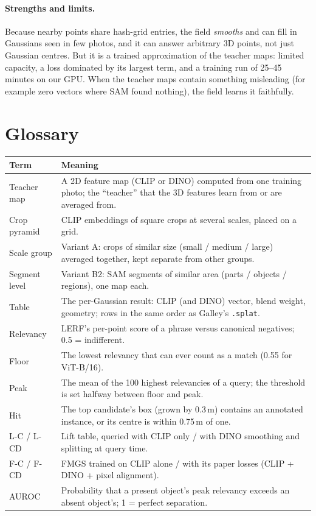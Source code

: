 \documentclass[11pt,a4paper]{article}
\newcommand{\code}[1]{\texttt{#1}}
\begin{document}
\paragraph{Strengths and limits.} Because nearby points share hash-grid entries, the field \emph{smooths} and can
fill in Gaussians seen in few photos, and it can answer arbitrary 3D points, not just Gaussian centres. But it is a
trained approximation of the teacher maps: limited capacity, a loss dominated by its largest term, and a training run
of 25--45 minutes on our GPU. When the teacher maps contain something misleading (for example zero vectors where SAM
found nothing), the field learns it faithfully.

\section{Glossary}

\begin{table}[ht]
\centering\small
\begin{tabularx}{\linewidth}{@{}lL@{}}
\toprule
Term & Meaning \\
\midrule
Teacher map & A 2D feature map (CLIP or DINO) computed from one training photo; the ``teacher'' that the 3D features learn from or are averaged from. \\
Crop pyramid & CLIP embeddings of square crops at several scales, placed on a grid. \\
Scale group & Variant A: crops of similar size (small / medium / large) averaged together, kept separate from other groups. \\
Segment level & Variant B2: SAM segments of similar area (parts / objects / regions), one map each. \\
Table & The per-Gaussian result: CLIP (and DINO) vector, blend weight, geometry; rows in the same order as Galley's \code{.splat}. \\
Relevancy & LERF's per-point score of a phrase versus canonical negatives; 0.5 = indifferent. \\
Floor & The lowest relevancy that can ever count as a match (0.55 for ViT-B/16). \\
Peak & The mean of the 100 highest relevancies of a query; the threshold is set halfway between floor and peak. \\
Hit & The top candidate's box (grown by 0.3\,m) contains an annotated instance, or its centre is within 0.75\,m of one. \\
L-C / L-CD & Lift table, queried with CLIP only / with DINO smoothing and splitting at query time. \\
F-C / F-CD & FMGS trained on CLIP alone / with its paper losses (CLIP + DINO + pixel alignment). \\
AUROC & Probability that a present object's peak relevancy exceeds an absent object's; 1 = perfect separation. \\
\bottomrule
\end{tabularx}
\end{table}
\end{document}
